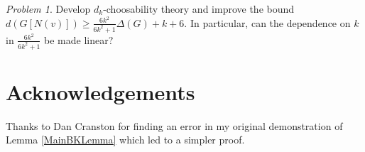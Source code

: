 \documentclass[12pt]{article}
\theoremstyle{plain}
\theoremstyle{definition}
\theoremstyle{remark}
\newtheorem*{problem}{Problem}
\begin{document}
\begin{problem}
Develop $d_k$-choosability theory and improve the bound $d(G[N(v)]) \geq \frac{6k^2}{6k^2 + 1}\Delta(G) + k + 6$.  In particular, can the dependence on $k$ in $\frac{6k^2}{6k^2 + 1}$ be made linear?
\end{problem}

\section{Acknowledgements}
\noindent Thanks to Dan Cranston for finding an error in my original demonstration of Lemma \ref{MainBKLemma} which led to a simpler proof.



\end{document}
